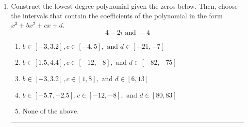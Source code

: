 \documentclass[14pt]{extbook}
\newcommand{\litem}[1]{\item#1\hspace*{-1cm}\rule{\textwidth}{0.4pt}}
\begin{document}
\begin{enumerate}
\litem{
Construct the lowest-degree polynomial given the zeros below. Then, choose the intervals that contain the coefficients of the polynomial in the form $x^3+bx^2+cx+d$.\[ 4 - 2 i \text{ and } -4 \]\begin{enumerate}[label=\Alph*.]
\item \( b \in [-3, 3.2], c \in [-4, 5], \text{ and } d \in [-21, -7] \)
\item \( b \in [1.5, 4.4], c \in [-12, -8], \text{ and } d \in [-82, -75] \)
\item \( b \in [-3, 3.2], c \in [1, 8], \text{ and } d \in [6, 13] \)
\item \( b \in [-5.7, -2.5], c \in [-12, -8], \text{ and } d \in [80, 83] \)
\item \( \text{None of the above.} \)

\end{enumerate} }
\end{enumerate}
\end{document}
